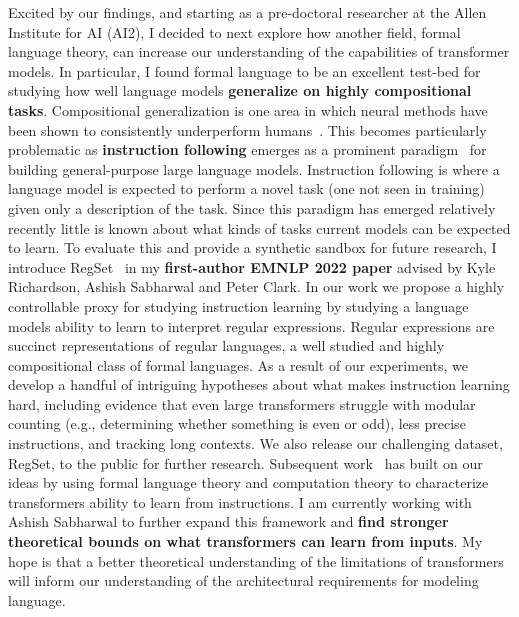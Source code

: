 \documentclass[11pt]{article}
\begin{document}
Excited by our findings, and starting as a pre-doctoral researcher at the Allen Institute for AI (AI2),
I decided to next explore how another field, formal language theory, 
can increase our understanding of the capabilities of transformer models.
In particular, I found formal language to be an excellent test-bed for
studying how well language models 
\textbf{generalize on highly compositional tasks}. 
Compositional generalization is one area in which 
neural methods have been shown 
to consistently underperform humans~\cite{Lake2018GeneralizationWS}.
This becomes particularly problematic 
as \textbf{instruction following} emerges 
as a prominent paradigm~\cite{mishra2021crosstask, Wei2021FinetunedLM}
for building general-purpose large language models. 
Instruction following is where a language model is expected to perform a novel task
(one not seen in training) given only a description of the task.
Since this paradigm has emerged relatively recently
little is known about what kinds of tasks current models can be expected to learn.
To evaluate this and provide a synthetic sandbox for future research,
I introduce RegSet~\cite{Finlayson2022WhatMI} in my \textbf{first-author EMNLP 2022 paper} 
advised by Kyle Richardson, Ashish Sabharwal and Peter Clark. 
In our work we propose a highly controllable proxy for studying instruction learning
by studying a language models ability to learn to interpret regular expressions.
Regular expressions are succinct representations of regular languages, 
a well studied and highly compositional class of formal languages.
As a result of our experiments,
we develop a handful of intriguing hypotheses 
about what makes instruction learning hard, 
including evidence that even large transformers struggle with modular counting 
(e.g., determining whether something is even or odd), 
less precise instructions, and tracking long contexts. 
We also release our challenging dataset, RegSet, to the public for further research.
Subsequent work~\cite{Merrill2022LogPrecisionTA} 
has built on our ideas by using formal language theory and computation theory
to characterize transformers ability to learn from instructions.
I am currently working with Ashish Sabharwal to further expand 
this framework and 
\textbf{find stronger theoretical bounds on what transformers can learn from inputs}.
My hope is that a better theoretical understanding 
of the limitations of transformers will inform 
our understanding of the architectural requirements 
for modeling language.
\end{document}
